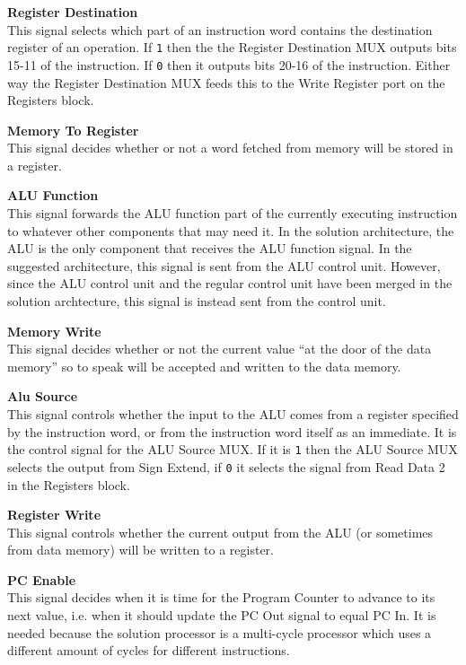 \begin{description}
\item{\textbf{Register Destination}} \\
This signal selects which part of an instruction word contains the destination register of an operation.
If \texttt{1} then the the Register Destination MUX outputs bits 15-11 of the instruction. If \texttt{0} then it outputs bits 20-16 of the instruction.
Either way the Register Destination MUX feeds this to the Write Register port on the Registers block.

\item{\textbf{Memory To Register}} \\
This signal decides whether or not a word fetched from memory will be stored in a register.

\item{\textbf{ALU Function}} \\
This signal forwards the ALU function part of the currently executing instruction to whatever other components that may need it.
In the solution architecture, the ALU is the only component that receives the ALU function signal.
In the suggested architecture, this signal is sent from the ALU control unit.
However, since the ALU control unit and the regular control unit have been merged in the solution archtecture, this signal is instead sent from the control unit.

\item{\textbf{Memory Write}} \\
This signal decides whether or not the current value ``at the door of the data memory'' so to speak will be accepted and written to the data memory.

\item{\textbf{Alu Source}} \\
This signal controls whether the input to the ALU comes from a register specified by the instruction word, or from the instruction word itself as an immediate.
It is the control signal for the ALU Source MUX.
If it is \texttt{1} then the ALU Source MUX selects the output from Sign Extend, if \texttt{0} it selects the signal from Read Data 2 in the Registers block.

\item{\textbf{Register Write}} \\
This signal controls whether the current output from the ALU (or sometimes from data memory) will be written to a register.

\item{\textbf{PC Enable}} \\
This signal decides when it is time for the Program Counter to advance to its next value, i.e. when it should update the PC Out signal to equal PC In.
It is needed because the solution processor is a multi-cycle processor which uses a different amount of cycles for different instructions.


\end{description}
